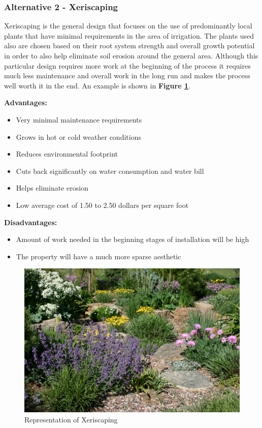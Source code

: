 \documentclass{ceri}
\begin{document}
\subsubsection{Alternative 2 - Xeriscaping}
Xeriscaping is the general design that focuses on the use of predominantly local plants that have minimal requirements in the area of irrigation. The plants used also are chosen based on their root system strength and overall growth potential in order to also help eliminate soil erosion around the general area. Although this particular design requires more work at the beginning of the process it requires much less maintenance and overall work in the long run and makes the process well worth it in the end. An example is shown in \textbf{Figure \ref{fig:AustinY}}.

	\textbf{Advantages:}
\begin{itemize}
\item  Very minimal maintenance requirements
\item  Grows in hot or cold weather conditions
\item  Reduces environmental footprint
\item  Cuts back significantly on water consumption and water bill
\item  Helps eliminate erosion
\item  Low average cost of 1.50 to 2.50 dollars per square foot 
\end{itemize}

	\textbf{Disadvantages:}
\begin{itemize}
\item  Amount of work needed in the beginning stages of installation will be high
\item  The property will have a much more sparse aesthetic 
\end{itemize}

\begin{figure}[H]
    \centering
    \includegraphics[width=.8\textwidth]{images/Austin-Y.png}
    \caption{Representation of Xeriscaping}
    \label{fig:AustinY}
\end{figure}
\end{document}

